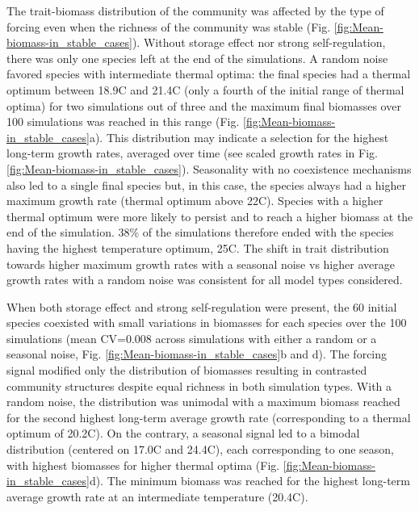 \documentclass[smallcondensed,referee]{svjour3}       %
\begin{document}
The trait-biomass distribution of the community was affected by the
type of forcing even when the richness of the community was stable
(Fig. \ref{fig:Mean-biomass-in_stable_cases}). Without storage effect
nor strong self-regulation, there was only one species left at the
end of the simulations. A random noise favored species with intermediate
thermal optima: the final species had a thermal optimum between 18.9\textdegree C
and 21.4\textdegree C (only a fourth of the initial range of thermal optima)
for two simulations out of three and the maximum final biomasses over
100 simulations was reached in this range (Fig. \ref{fig:Mean-biomass-in_stable_cases}a).
This distribution may indicate a selection for the highest long-term
growth rates, averaged over time (see scaled growth rates in Fig.
\ref{fig:Mean-biomass-in_stable_cases}). Seasonality with no coexistence
mechanisms also led to a single final species but, in this case, the
species always had a higher maximum growth rate (thermal optimum above
22\textdegree C). Species with a higher thermal optimum were more likely to persist
and to reach a higher biomass at the end of the simulation. 38\% of
the simulations therefore ended with the species having the highest
temperature optimum, 25\textdegree C. The shift in trait distribution towards
higher maximum growth rates with a seasonal noise vs higher average
growth rates with a random noise was consistent for all model types
considered. 

When both storage effect and strong self-regulation were present,
the 60 initial species coexisted with small variations in biomasses
for each species over the 100 simulations (mean CV=0.008 across simulations
with either a random or a seasonal noise, Fig. \ref{fig:Mean-biomass-in_stable_cases}b
and d). The forcing signal modified only the distribution of biomasses
resulting in contrasted community structures despite equal richness
in both simulation types. With a random noise, the distribution was
unimodal with a maximum biomass reached for the second highest long-term
average growth rate (corresponding to a thermal optimum of 20.2\textdegree C).
On the contrary, a seasonal signal led to a bimodal distribution (centered
on 17.0\textdegree C and 24.4\textdegree C), each corresponding to one season, with highest
biomasses for higher thermal optima (Fig. \ref{fig:Mean-biomass-in_stable_cases}d).
The minimum biomass was reached for the highest long-term average
growth rate at an intermediate temperature (20.4\textdegree C).
\end{document}
